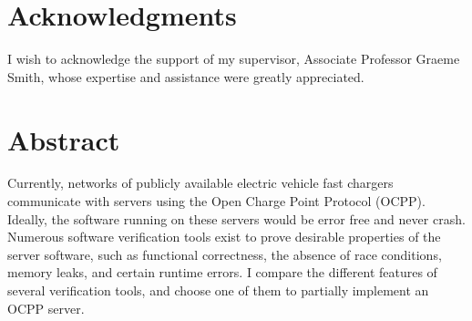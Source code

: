 \documentclass[12pt,openany,a4paper]{book}
\begin{document}
\cleardoublepage


\chapter{Acknowledgments}

I wish to acknowledge the support of my supervisor, Associate Professor Graeme Smith, whose expertise and assistance were greatly appreciated.
\cleardoublepage

\chapter{Abstract}

Currently, networks of publicly available electric vehicle fast chargers communicate with servers using the Open Charge Point Protocol (OCPP). Ideally, the software running on these servers would be error free and never crash. Numerous software verification tools exist to prove desirable properties of the server software, such as functional correctness, the absence of race conditions, memory leaks, and certain runtime errors. I compare the different features of several verification tools, and choose one of them to partially implement an OCPP server.

\tableofcontents

\listoffigures
{}

\listoftables
{}

% 

\cleardoublepage

\mainmatter


%
%
%
%	
%	
\end{document}
